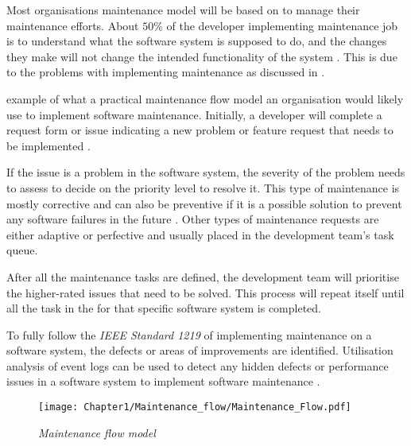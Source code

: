 Most organisations maintenance model will be based on  to manage their maintenance efforts. About $50\%$ of the developer implementing maintenance job is to understand what the software system is supposed to do, and the changes they make will not change the intended functionality of the system \cite{Tang2010,Zhuo1993}. This is due to the problems with implementing maintenance as discussed in .\par {} example of what a practical maintenance flow model an organisation would likely use to implement software maintenance. Initially, a developer will complete a request form or issue indicating a new problem or feature request that needs to be implemented \cite{Tang2010}.\par If the issue is a problem in the software system, the severity of the problem needs to assess to decide on the priority level to resolve it. This type of maintenance is mostly corrective and can also be preventive if it is a possible solution to prevent any software failures in the future \cite{Tang2010}. Other types of maintenance requests are either adaptive or perfective and usually placed in the development team's task queue.\par After all the maintenance tasks are defined, the development team will prioritise the higher-rated issues that need to be solved. This process will repeat itself until all the task in the for that specific software system is completed.\par To fully follow the \textit{IEEE Standard 1219} of implementing maintenance on a software system, the defects or areas of improvements are identified. Utilisation analysis of event logs can be used to detect any hidden defects or performance issues in a software system to implement software maintenance \cite{Cinque2013, Rong2018a, Levin2019}.

\begin{figure}[!htb] %
	\centering %
	\texttt{[image: Chapter1/Maintenance\_flow/Maintenance\_Flow.pdf]}
	\caption[Maintenance flow model]
	{\textit{Maintenance flow model \cite{Tang2010}}} \label{fig:CH1_MaintenanceFlow}
\end{figure}

\clearpage

